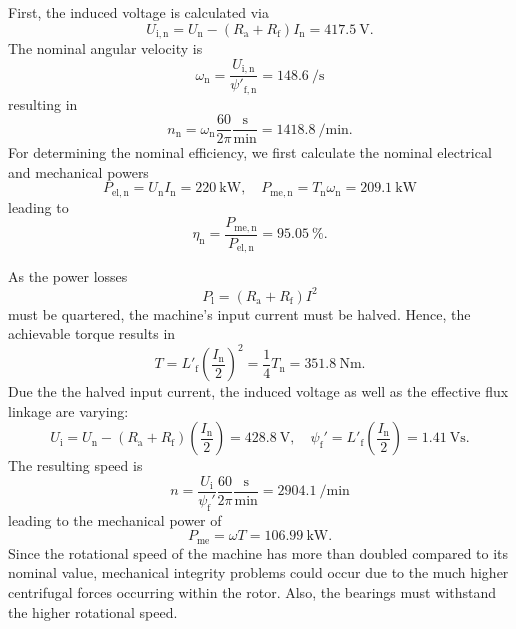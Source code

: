 \begin{solutionblock}
    First, the induced voltage is calculated via
    $$
    U_\mathrm{i,n} = U_\mathrm{n} - (R_\mathrm{a} + R_\mathrm{f})I_\mathrm{n} = \SI{417.5}{\volt}.
    $$
    The nominal angular velocity is
    $$
    \omega_\mathrm{n} = \frac{U_\mathrm{i,n}}{\psi'_\mathrm{f,n}} = \SI{148.6}{\per\second}
    $$
    resulting in
    $$
    n_\mathrm{n} = \omega_\mathrm{n} \frac{60}{2\pi}\frac{\si{\second}}{\si{\minute}} = \SI{1418.8}{\per\minute}. 
    $$
    For determining the nominal efficiency, we first calculate the nominal electrical and mechanical powers
    $$
    P_\mathrm{el,n} = U_\mathrm{n}I_\mathrm{n} = \SI{220}{\kilo\watt}, \quad P_\mathrm{me,n} = T_\mathrm{n}\omega_\mathrm{n} = \SI{209.1}{\kilo\watt}
    $$
    leading to
    $$
    \eta_\mathrm{n} = \frac{P_\mathrm{me,n}}{P_\mathrm{el,n}} = \SI{95.05}{\percent}.
    $$
\end{solutionblock}


\begin{solutionblock}
As the power losses
$$
P_\mathrm{l} = (R_\mathrm{a}+R_\mathrm{f})I^2
$$
must be quartered, the machine's input current must be halved. Hence, the achievable torque results in
$$
T = L'_\mathrm{f}\left(\frac{I_\mathrm{n}}{2}\right)^2=\frac{1}{4}T_\mathrm{n} = \SI{351.8}{\newton\meter}. 
$$
Due the the halved input current, the induced voltage as well as the effective flux linkage are varying:
$$
U_\mathrm{i} = U_\mathrm{n} - (R_\mathrm{a}+R_\mathrm{f})\left(\frac{I_\mathrm{n}}{2}\right) = \SI{428.8}{\volt}, \quad \psi_\mathrm{f}' = L'_\mathrm{f} \left(\frac{I_\mathrm{n}}{2}\right) = \SI{1.41}{\volt\second}.
$$
The resulting speed is
$$
n = \frac{U_\mathrm{i}}{\psi_\mathrm{f}'} \frac{60}{2\pi}\frac{\si{\second}}{\si{\minute}} = \SI{2904.1}{\per\minute}
$$
leading to the mechanical power of 
$$
P_\mathrm{me} = \omega T = \SI{106.99}{\kilo\watt}.
$$
Since the rotational speed of the machine has more than doubled compared to its nominal value, mechanical integrity problems could occur due to the much higher centrifugal forces occurring within the rotor. Also, the bearings must withstand the higher rotational speed. 
\end{solutionblock}

